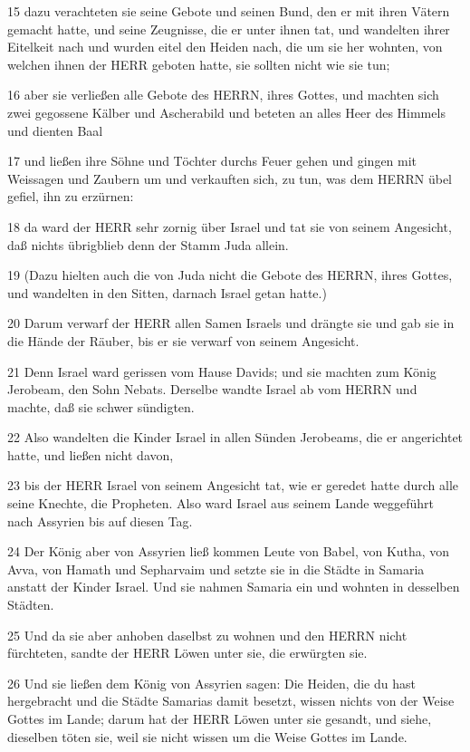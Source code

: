 \par 15 dazu verachteten sie seine Gebote und seinen Bund, den er mit ihren Vätern gemacht hatte, und seine Zeugnisse, die er unter ihnen tat, und wandelten ihrer Eitelkeit nach und wurden eitel den Heiden nach, die um sie her wohnten, von welchen ihnen der HERR geboten hatte, sie sollten nicht wie sie tun;
\par 16 aber sie verließen alle Gebote des HERRN, ihres Gottes, und machten sich zwei gegossene Kälber und Ascherabild und beteten an alles Heer des Himmels und dienten Baal
\par 17 und ließen ihre Söhne und Töchter durchs Feuer gehen und gingen mit Weissagen und Zaubern um und verkauften sich, zu tun, was dem HERRN übel gefiel, ihn zu erzürnen:
\par 18 da ward der HERR sehr zornig über Israel und tat sie von seinem Angesicht, daß nichts übrigblieb denn der Stamm Juda allein.
\par 19 (Dazu hielten auch die von Juda nicht die Gebote des HERRN, ihres Gottes, und wandelten in den Sitten, darnach Israel getan hatte.)
\par 20 Darum verwarf der HERR allen Samen Israels und drängte sie und gab sie in die Hände der Räuber, bis er sie verwarf von seinem Angesicht.
\par 21 Denn Israel ward gerissen vom Hause Davids; und sie machten zum König Jerobeam, den Sohn Nebats. Derselbe wandte Israel ab vom HERRN und machte, daß sie schwer sündigten.
\par 22 Also wandelten die Kinder Israel in allen Sünden Jerobeams, die er angerichtet hatte, und ließen nicht davon,
\par 23 bis der HERR Israel von seinem Angesicht tat, wie er geredet hatte durch alle seine Knechte, die Propheten. Also ward Israel aus seinem Lande weggeführt nach Assyrien bis auf diesen Tag.
\par 24 Der König aber von Assyrien ließ kommen Leute von Babel, von Kutha, von Avva, von Hamath und Sepharvaim und setzte sie in die Städte in Samaria anstatt der Kinder Israel. Und sie nahmen Samaria ein und wohnten in desselben Städten.
\par 25 Und da sie aber anhoben daselbst zu wohnen und den HERRN nicht fürchteten, sandte der HERR Löwen unter sie, die erwürgten sie.
\par 26 Und sie ließen dem König von Assyrien sagen: Die Heiden, die du hast hergebracht und die Städte Samarias damit besetzt, wissen nichts von der Weise Gottes im Lande; darum hat der HERR Löwen unter sie gesandt, und siehe, dieselben töten sie, weil sie nicht wissen um die Weise Gottes im Lande.
